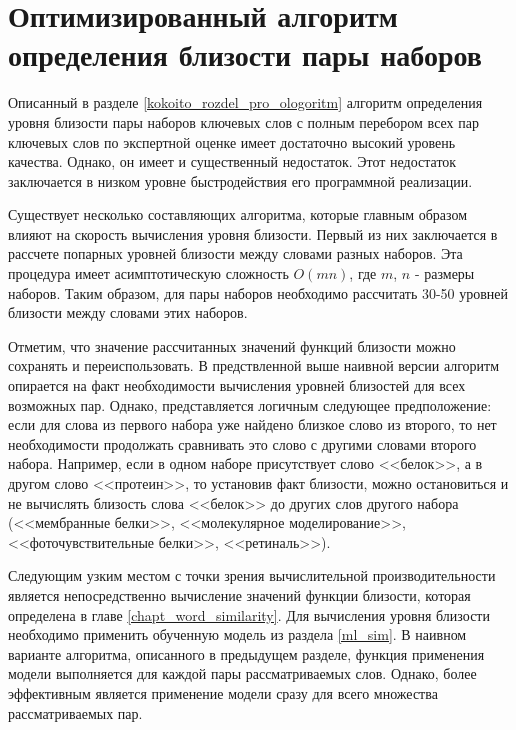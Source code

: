 \section{Оптимизированный алгоритм определения близости пары наборов} \label{kokoito_drugoi_rozdel}

Описанный в разделе \ref{kokoito_rozdel_pro_ologoritm} алгоритм определения уровня близости пары наборов ключевых слов с полным перебором всех пар ключевых слов по экспертной оценке имеет достаточно высокий уровень качества. Однако, он имеет и существенный недостаток. Этот недостаток заключается в низком уровне быстродействия его программной реализации. 

Существует несколько составляющих алгоритма, которые главным образом влияют на скорость вычисления уровня близости. Первый из них заключается в рассчете попарных уровней близости между словами разных наборов. Эта процедура имеет асимптотическую сложность $O(mn)$, где $m$, $n$ - размеры наборов. Таким образом, для пары наборов необходимо рассчитать 30-50 уровней близости между словами этих наборов.

Отметим, что значение рассчитанных значений функций близости можно сохранять и переиспользовать. В предствленной выше наивной версии алгоритм опирается на факт необходимости вычисления уровней близостей для всех возможных пар. Однако, представляется логичным следующее предположение: если для слова из первого набора уже найдено близкое слово из второго, то нет необходимости продолжать сравнивать это слово с другими словами второго набора. Например, если в одном наборе присутствует слово <<белок>>, а в другом слово <<протеин>>, то установив факт близости, можно остановиться и не вычислять близость слова <<белок>> до других слов другого набора (<<мембранные белки>>, <<молекулярное моделирование>>, <<фоточувствительные белки>>, <<ретиналь>>).

Следующим узким местом с точки зрения вычислительной производительности является непосредственно вычисление значений функции близости, которая определена в главе \ref{chapt_word_similarity}. Для вычисления уровня близости необходимо применить обученную модель из раздела \ref{ml_sim}. В наивном варианте алгоритма, описанного в предыдущем разделе, функция применения модели выполняется для каждой пары рассматриваемых слов. Однако, более эффективным является применение модели сразу для всего множества рассматриваемых пар.

